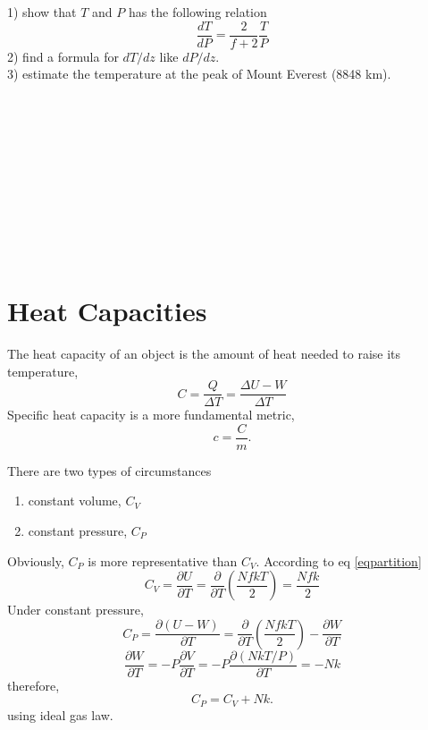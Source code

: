1) show that $T$ and $P$ has the following relation
  \begin{equation} \frac{dT}{dP} = \frac{2}{f+2} \frac{T}{P} \end{equation}
2) find a formula for $dT/dz$ like $dP/dz$.\\
3) estimate the temperature at the peak of Mount Everest (8848 km).\\\\\\\\\\\\\\\\\\\\\

\section{Heat Capacities}
The heat capacity of an object is the amount of heat needed to raise its temperature,
  \begin{equation} C = \frac{Q}{\Delta{T}} = \frac{\Delta{U}-W}{\Delta{T}}\end{equation}
Specific heat capacity is a more fundamental metric,
  \begin{equation} c = \frac{C}{m}. \end{equation}

There are two types of circumstances
\begin{enumerate}
\item{constant volume}, $C_V$
\item{constant pressure}, $C_P$
\end{enumerate}
Obviously, $C_P$ is more representative than $C_V$.
According to eq \ref{eqpartition}
  \begin{equation} C_V = \frac{\partial U}{\partial{T}} 
                       = \frac{\partial} {\partial{T}}(\frac {NfkT}{2})
                       = \frac{Nfk}{2}
  \end{equation}
Under constant pressure,
  \begin{equation} C_P = \frac{\partial (U-W)} {\partial{T}} 
                       = \frac{\partial} {\partial{T}}(\frac {NfkT}{2}) - \frac{\partial W}{\partial{T}}
  \end{equation}
  \begin{equation}
                \frac{\partial W}{\partial{T}} = -P\frac{\partial V}{\partial T} 
                                                = -P\frac{\partial (NkT/P)}{\partial T} 
                                                = -Nk
  \end{equation}
therefore, 
  \begin{equation} C_P = C_V + Nk. \end{equation}
using ideal gas law.\\\\

